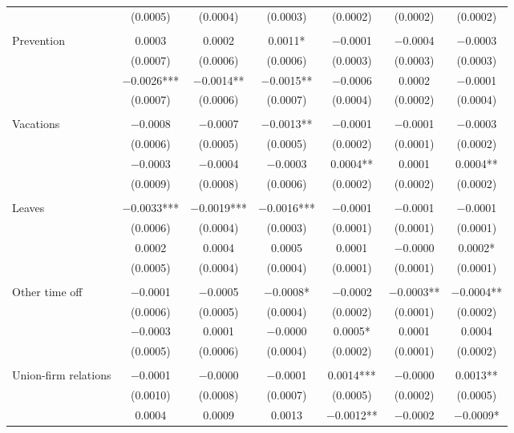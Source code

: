 \documentclass[12pt,letterpaper]{article}
\begin{document}
\begin{longtable}{l cccccc}
  & (0.0005) & (0.0004) & (0.0003) & (0.0002) & (0.0002) & (0.0002) \\
 & & & & & & \\
\quad Prevention & 0.0003 & 0.0002 & 0.0011* & $-$0.0001 & $-$0.0004 & $-$0.0003 \\
  & (0.0007) & (0.0006) & (0.0006) & (0.0003) & (0.0003) & (0.0003) \\
  & $-$0.0026*** & $-$0.0014** & $-$0.0015** & $-$0.0006 & 0.0002 & $-$0.0001 \\
  & (0.0007) & (0.0006) & (0.0007) & (0.0004) & (0.0002) & (0.0004) \\
 & & & & & & \\
\quad Vacations & $-$0.0008 & $-$0.0007 & $-$0.0013** & $-$0.0001 & $-$0.0001 & $-$0.0003 \\
  & (0.0006) & (0.0005) & (0.0005) & (0.0002) & (0.0001) & (0.0002) \\
  & $-$0.0003 & $-$0.0004 & $-$0.0003 & 0.0004** & 0.0001 & 0.0004** \\
  & (0.0009) & (0.0008) & (0.0006) & (0.0002) & (0.0002) & (0.0002) \\
 & & & & & & \\
\quad Leaves & $-$0.0033*** & $-$0.0019*** & $-$0.0016*** & $-$0.0001 & $-$0.0001 & $-$0.0001 \\
  & (0.0006) & (0.0004) & (0.0003) & (0.0001) & (0.0001) & (0.0001) \\
  & 0.0002 & 0.0004 & 0.0005 & 0.0001 & $-$0.0000 & 0.0002* \\
  & (0.0005) & (0.0004) & (0.0004) & (0.0001) & (0.0001) & (0.0001) \\
 & & & & & & \\
\quad Other time off & $-$0.0001 & $-$0.0005 & $-$0.0008* & $-$0.0002 & $-$0.0003** & $-$0.0004** \\
  & (0.0006) & (0.0005) & (0.0004) & (0.0002) & (0.0001) & (0.0002) \\
  & $-$0.0003 & 0.0001 & $-$0.0000 & 0.0005* & 0.0001 & 0.0004 \\
  & (0.0005) & (0.0006) & (0.0004) & (0.0002) & (0.0001) & (0.0002) \\
 & & & & & & \\
\quad Union-firm relations & $-$0.0001 & $-$0.0000 & $-$0.0001 & 0.0014*** & $-$0.0000 & 0.0013** \\
  & (0.0010) & (0.0008) & (0.0007) & (0.0005) & (0.0002) & (0.0005) \\
  & 0.0004 & 0.0009 & 0.0013 & $-$0.0012** & $-$0.0002 & $-$0.0009* \\

\end{longtable}
\end{document}
